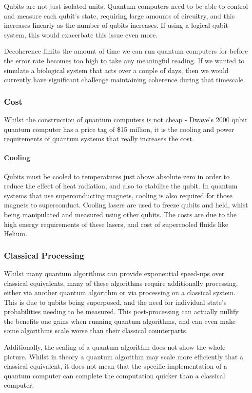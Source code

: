 Qubits are not just isolated units. Quantum computers need to be able to control and measure each qubit's state, requiring large amounts of circuitry, and this increases linearly as the number of qubits increases. If using a logical qubit system, this would exacerbate this issue even more.

Decoherence limits the amount of time we can run quantum computers for before the error rate becomes too high to take any meaningful reading. If we wanted to simulate a biological system that acts over a couple of days, then we would currently have significant challenge maintaining coherence during that timescale.

{}
\subsubsection*{Cost}
Whilst the construction of quantum computers is not cheap - Dwave's 2000 qubit quantum computer has a price tag of \$15 million, it is the cooling and power requirements of quantum systems that really increases the cost.

{}
\paragraph*{Cooling}
\noindent
Qubits must be cooled to temperatures just above absolute zero in order to reduce the effect of heat radiation, and also to stabilise the qubit. In quantum systems that use superconducting magnets, cooling is also required for those magnets to superconduct. Cooling lasers are used to freeze qubits and held, whist being manipulated and measured using other qubits.
The costs are due to the high energy requirements of these lasers, and cost of supercooled fluids like Helium.

{}
\subsubsection*{Classical Processing}
Whilst many quantum algorithms can provide exponential speed-ups over classical equivalents, many of these algorithms require additionally processing, either via another quantum algorithm or via processing on a classical system. This is due to qubits being superposed, and the need for individual state's probabilities needing to be measured. This post-processing can actually nullify the benefits one gains when running quantum algorithms, and can even make some algorithms scale worse than their classical counterparts. 

Additionally, the scaling of a quantum algorithm does not show the whole picture. Whilst in theory a quantum algorithm may scale more efficiently that a classical equivalent, it does not mean that the specific implementation of a quantum computer can complete the computation quicker than a classical computer.
